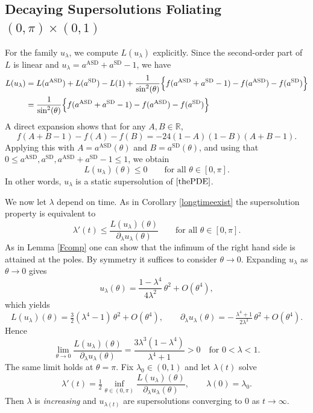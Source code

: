 \documentclass[11pt,a4paper]{article}
\numberwithin{equation}{section}
\theoremstyle{plain}
\theoremstyle{remark}
\begin{document}
\subsection{Decaying Supersolutions Foliating $(0,\pi)\times(0,1)$}
For the family $u_\lambda$, we compute $L(u_\lambda)$ explicitly. Since the second-order part of $L$ is linear and $u_\lambda = a^{\mathrm{ASD}} + a^{\mathrm{SD}} - 1$, we have
\begin{align*}
    L(u_\lambda)
&=
L(a^{\mathrm{ASD}}) + L(a^{\mathrm{SD}}) - L(1)
+\frac{1}{\sin^2(\theta)}
\Bigl\{
f(a^{\mathrm{ASD}} + a^{\mathrm{SD}} - 1)
- f(a^{\mathrm{ASD}}) - f(a^{\mathrm{SD}})
\Bigr\}\\
&=\frac{1}{\sin^2(\theta)}
\Bigl\{
f(a^{\mathrm{ASD}} + a^{\mathrm{SD}} - 1)
- f(a^{\mathrm{ASD}}) - f(a^{\mathrm{SD}})
\Bigr\}
\end{align*}
A direct expansion shows that for any $A,B\in\mathbb{R}$,
$$
f(A+B-1)-f(A)-f(B)
=
-24(1-A)(1-B)(A+B-1).
$$
Applying this with $A=a^{\mathrm{ASD}}(\theta)$ and $B=a^{\mathrm{SD}}(\theta)$, and using that $0\leq a^{\mathrm{ASD}},a^{\mathrm{SD}},a^{\mathrm{ASD}}+a^{\mathrm{SD}}-1\leq1$, we obtain
$$
L(u_\lambda)(\theta) \le 0
\qquad \text{for all } \theta\in[0,\pi].
$$
In other words, $u_\lambda$ is a static supersolution of $\eqref{thePDE}$. 

We now let $\lambda$ depend on time. As in Corollary \ref{longtimeexist} the supersolution property is equivalent to
$$
\lambda'(t) \le \frac{L(u_\lambda)(\theta)}{\partial_\lambda u_\lambda(\theta)}
\qquad \text{for all } \theta\in[0,\pi].
$$
As in Lemma \ref{Fcomp} one can show that the infimum of the right hand side is attained at the poles. By symmetry it suffices to consider $\theta\to 0$. Expanding $u_\lambda$ as $\theta\to 0$ gives
$$
u_\lambda(\theta)
=
\frac{1-\lambda^4}{4\lambda^2}\,\theta^2 + O(\theta^4),
$$
which yields
$$
L(u_\lambda)(\theta)
=
\tfrac{3}{2}(\lambda^4-1)\,\theta^2 + O(\theta^4),
\qquad
\partial_\lambda u_\lambda(\theta)
=
-\,\tfrac{\lambda^4+1}{2\lambda^3}\,\theta^2 + O(\theta^4).
$$
Hence
$$
\lim_{\theta\to 0}
\frac{L(u_\lambda)(\theta)}{\partial_\lambda u_\lambda(\theta)}
=
\frac{3\lambda^3(1-\lambda^4)}{\lambda^4+1}
>0
\quad \text{for } 0<\lambda<1.
$$
The same limit holds at $\theta=\pi$. Fix $\lambda_0\in(0,1)$ and let $\lambda(t)$ solve
$$
\lambda'(t)=\tfrac12 \inf_{\theta\in(0,\pi)} \frac{L(u_\lambda)(\theta)}{\partial_\lambda u_\lambda(\theta)}, \qquad \lambda(0)=\lambda_0.
$$
Then $\lambda$ is \textit{increasing} and $u_{\lambda(t)}$ are supersolutions converging to $0$ as $t\to\infty$. 
\end{document}
